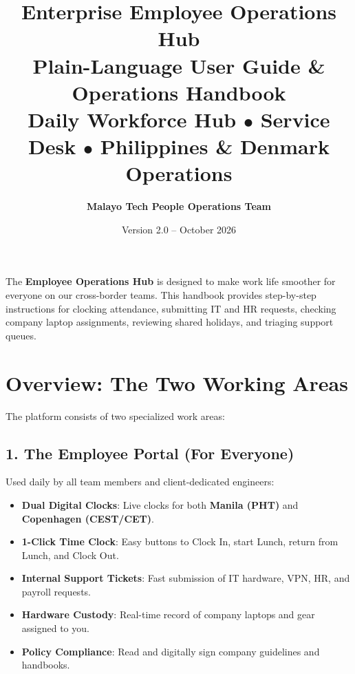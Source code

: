 \documentclass[a4paper,11pt]{article}
\title{
  \vspace{-1.5cm}
  {\LARGE\textbf{\textcolor{branddark}{Enterprise Employee Operations Hub}}}\\[0.4cm]
  {\large\textbf{\textcolor{brandblue}{Plain-Language User Guide \& Operations Handbook}}}\\[0.3cm]
  {\small\textcolor{brandgray}{Daily Workforce Hub $\bullet$ Service Desk $\bullet$ Philippines \& Denmark Operations}}
}
\author{\textbf{Malayo Tech People Operations Team}}
\date{Version 2.0 -- October 2026}
\begin{document}
\maketitle
\thispagestyle{empty}

\vspace{-0.4cm}
\begin{center}
\begin{minipage}{0.96\textwidth}
\begin{infobox}
The \textbf{Employee Operations Hub} is designed to make work life smoother for everyone on our cross-border teams. This handbook provides step-by-step instructions for clocking attendance, submitting IT and HR requests, checking company laptop assignments, reviewing shared holidays, and triaging support queues.
\end{infobox}
\end{minipage}
\end{center}

\vspace{0.2cm}
\tableofcontents
\newpage

\section{Overview: The Two Working Areas}

The platform consists of two specialized work areas:

\subsection{1. The Employee Portal (For Everyone)}
Used daily by all team members and client-dedicated engineers:
\begin{itemize}
    \item \textbf{Dual Digital Clocks}: Live clocks for both \textbf{Manila (PHT)} and \textbf{Copenhagen (CEST/CET)}.
    \item \textbf{1-Click Time Clock}: Easy buttons to Clock In, start Lunch, return from Lunch, and Clock Out.
    \item \textbf{Internal Support Tickets}: Fast submission of IT hardware, VPN, HR, and payroll requests.
    \item \textbf{Hardware Custody}: Real-time record of company laptops and gear assigned to you.
    \item \textbf{Policy Compliance}: Read and digitally sign company guidelines and handbooks.
\end{itemize}
\end{document}
